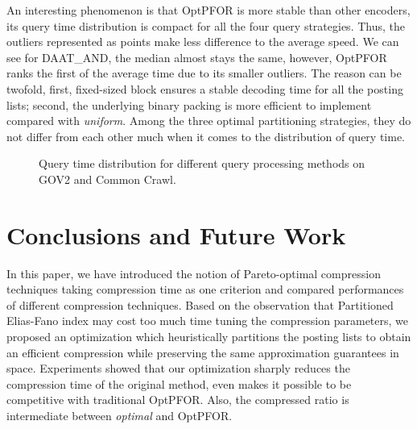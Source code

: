 \documentclass[runningheads]{comsis2}
\begin{document}
An interesting phenomenon is that OptPFOR is more stable than other encoders, its query time distribution is compact for all the four query strategies.
Thus, the outliers represented as points make less difference to the average speed.
We can see for DAAT\_AND, the median almost stays the same, however, OptPFOR ranks the first of the average time due to its smaller outliers.
The reason can be twofold, first, fixed-sized block ensures a stable decoding time for all the posting lists; second, the underlying binary packing is more efficient to implement compared with \textit{uniform}.
Among the three optimal partitioning strategies, they do not differ from each other much when it comes to the distribution of query time.
\begin{figure}
	\centering
	
	\caption{Query time distribution for different query processing methods on GOV2 and Common Crawl.}
	\label{fig:queries}
\end{figure}

\section{Conclusions and Future Work}\label{sec:conclusion}

In this paper, we have introduced the notion of Pareto-optimal compression techniques taking compression time as one criterion and compared performances of different compression techniques.
Based on the observation that Partitioned Elias-Fano index may cost too much time tuning the compression parameters, we proposed an optimization which heuristically partitions the posting lists to obtain an efficient compression while preserving the same approximation guarantees in space.
Experiments showed that our optimization sharply reduces the compression time of the original method, even makes it possible to be competitive with traditional OptPFOR.
Also, the compressed ratio is intermediate between \textit{optimal} and OptPFOR.
\end{document}
